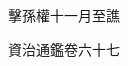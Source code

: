 擊孫權十一月至譙

資治通鑑卷六十七

















































































































































